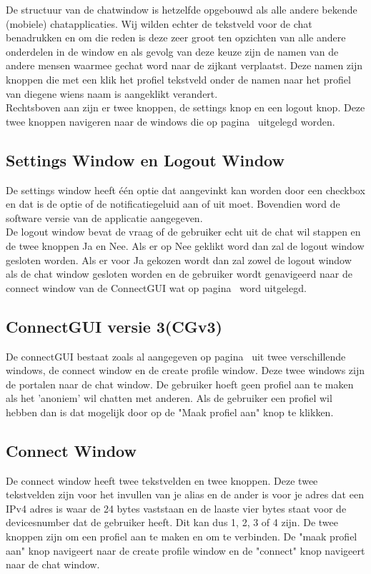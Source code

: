 \documentclass[12pt]{article}
\begin{document}
\noindent De structuur van de chatwindow is hetzelfde opgebouwd als alle andere bekende (mobiele) chatapplicaties. Wij wilden echter de tekstveld voor de chat benadrukken en om die reden is deze zeer groot ten opzichten van alle andere onderdelen in de window en als gevolg van deze keuze zijn de namen van de andere mensen waarmee gechat word naar de zijkant verplaatst. Deze namen zijn knoppen die met een klik het profiel tekstveld onder de namen naar het profiel van diegene wiens naam is aangeklikt verandert. \\

\noindent Rechtsboven aan zijn er twee knoppen, de settings knop en een logout knop. Deze twee knoppen navigeren naar de windows die op pagina~\pageref{LWSW} uitgelegd worden.

\subsection*{Settings Window en Logout Window}
\label{LWSW}
De settings window heeft \'e\'en optie dat aangevinkt kan worden door een checkbox en dat is de optie of de notificatiegeluid aan of uit moet. Bovendien word de software versie van de applicatie aangegeven.
\\

\noindent De logout window bevat de vraag of de gebruiker echt uit de chat wil stappen en de twee knoppen Ja en Nee. Als er op Nee geklikt word dan zal de logout window gesloten worden. Als er voor Ja gekozen wordt dan zal zowel de logout window als de chat window gesloten worden en de gebruiker wordt genavigeerd naar de connect window van de ConnectGUI wat op pagina~\pageref{connectie}  word uitgelegd.

\subsection{ConnectGUI versie 3(CGv3)}
\label{ConnectGUI}
De connectGUI bestaat zoals al aangegeven op pagina~\pageref{aangegeven} uit twee verschillende windows, de connect window en de create profile window. Deze twee windows zijn de portalen naar de chat window. De gebruiker hoeft geen profiel aan te maken als het 'anoniem' wil chatten met anderen. Als de gebruiker een profiel wil hebben dan is dat mogelijk door op de "Maak profiel aan" knop te klikken.

\subsection*{Connect Window}
\label{connectie}
De connect window heeft twee tekstvelden en twee knoppen. Deze twee tekstvelden zijn voor het invullen van je alias en de ander is voor je adres dat een IPv4 adres is waar de 24 bytes vaststaan en de laaste vier bytes staat voor de devicesnumber dat de gebruiker heeft. Dit kan dus 1, 2, 3 of 4 zijn. De twee knoppen zijn om een profiel aan te maken en om te verbinden. De "maak profiel aan" knop navigeert naar de create profile window en de "connect" knop navigeert naar de chat window.
\end{document}
